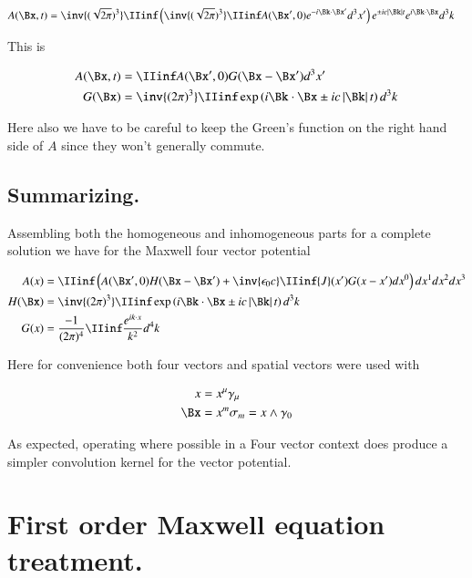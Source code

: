 \begin{align*}
{A}(\Bx, t)
&= 
\inv{(\sqrt{2\pi})^3} \IIinf 
\left( \inv{(\sqrt{2\pi})^3} \IIinf A(\Bx', 0) e^{ -i \Bk \cdot \Bx' } d^3 x' \right) e^{\pm i c \Abs{\Bk} t}
e^{ i \Bk \cdot \Bx } d^3 k
\end{align*}

This is

\begin{align}\label{eqn:4d_fourier:potentialHomogeneous}
{A}(\Bx, t) &= \IIinf A(\Bx', 0) G( \Bx - \Bx' ) d^3 x' \\
G(\Bx) &= \inv{({2\pi})^3} \IIinf \exp\left( i \Bk \cdot \Bx \pm i c \Abs{\Bk} t \right) d^3 k
\end{align}

Here also we have to be careful to keep the Green's function on the right hand side of $A$ since they 
won't generally commute.

\subsection{Summarizing. }

Assembling both the homogeneous and inhomogeneous parts for a complete solution we have for the Maxwell
four vector potential

\begin{align}
A(x) &= \IIinf \left( A(\Bx', 0) H( \Bx - \Bx' ) + \inv{\epsilon_0 c} \IIinf {J}(x') G(x-x') dx^0 \right) dx^1 dx^2 dx^3 \\
H(\Bx) &= \inv{({2\pi})^3} \IIinf \exp\left( i \Bk \cdot \Bx  \pm i c \Abs{\Bk} t \right) d^3 k \\
G(x) &= \frac{-1}{ ({2\pi})^4} \IIinf \frac{e^{ i k \cdot x }}{ k^2 } d^4 k
\end{align}

Here for convenience both four vectors and spatial vectors were used with

\begin{align*}
x &= x^\mu \gamma_\mu \\
\Bx &= x^m \sigma_m = x \wedge \gamma_0
\end{align*}

As expected, operating where possible in a Four vector context does produce a simpler convolution kernel for the vector potential.

\section{First order Maxwell equation treatment. }

